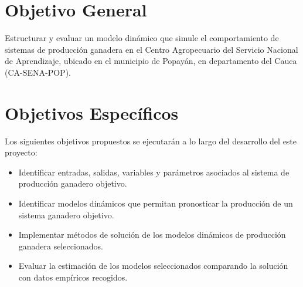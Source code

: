 
\section{Objetivo General}
Estructurar y evaluar un modelo dinámico que simule el comportamiento de sistemas de producción ganadera en el Centro Agropecuario del Servicio Nacional de Aprendizaje, ubicado en el municipio de Popayán, en departamento del Cauca (CA-SENA-POP).

\section{Objetivos Específicos}\label{objesp}

Los siguientes objetivos propuestos se ejecutarán a lo largo del desarrollo del este proyecto:

\begin{itemize} %
    \item Identificar entradas, salidas, variables y parámetros asociados al sistema de producción ganadero objetivo.
    \item Identificar modelos dinámicos que permitan pronosticar la producción de un sistema ganadero objetivo.
    \item Implementar métodos de solución de los modelos dinámicos de producción ganadera seleccionados.
    \item Evaluar la estimación de los modelos seleccionados comparando la solución con datos empíricos recogidos.
\end{itemize}


